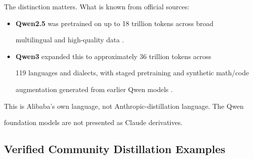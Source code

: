 The distinction matters. What is known from official sources:











\begin{itemize}





  \item \textbf{Qwen2.5} was pretrained on up to 18 trillion tokens across broad





    multilingual and high-quality data \cite{qwen25blog}.





  \item \textbf{Qwen3} expanded this to approximately 36 trillion tokens across





    119 languages and dialects, with staged pretraining and synthetic math/code





    augmentation generated from earlier Qwen models \cite{qwen3blog}.





\end{itemize}











This is Alibaba's own language, not Anthropic-distillation language. The Qwen





foundation models are not presented as Claude derivatives.











\subsection{Verified Community Distillation Examples}











